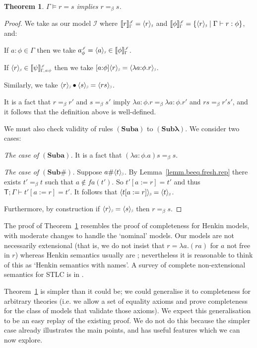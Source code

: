 \documentclass[submission,copyright]{eptcs}
\newtheorem{thrm}{Theorem}[section]
\newcommand{\beq}{=_{\scriptstyle{\beta}}}
\newcommand{\f}[1]{\ensuremath{\text{$\mathit{#1}$}}}
\newcommand{\lam}[1]{\lambda{#1}.}
\newcommand{\beeq}[1]{\ensuremath{\langle #1 \rangle_{\scalebox{.5}{\hspace{-.2ex}$\beta$}}}} \newcommand{\model}[1]{\ensuremath{\llbracket #1 \rrbracket}}
\newcommand{\rulefont}[1]{\ensuremath{(\mathbf{#1})}}
\newcommand{\ssm}{:=}
\newcommand{\theory}[1]{\ensuremath{\mathsf{#1}}}
\newcommand{\fa}{\f{fa}}
\newcommand\den[1]{{\hspace{.00ex}\scalebox{.55}{$#1$}}}
\newcommand{\idenot}[2]{\denot{\interp I}{#1}{#2}}
\newcommand\interp[1]{\ensuremath{\mathscr #1}}
\newcommand{\denot}[3]{\llbracket #3 \rrbracket_{\scalebox{.6}{$#2$}}^\den{#1}} \newcommand{\hdenot}[1]{\denot{\interp H}{}{#1}}
\newcommand\cent{\vdash}
\newcommand\ment{\vDash}
\begin{document}
\begin{thrm}
\label{thrm.st.complete}
$\Gamma\ment r=s$ implies $r\beq s$.
\end{thrm}
\begin{proof}
We take as our model $\interp I$ where $\idenot{\Gamma}{r}=\beeq{r}$ and $\idenot{\Gamma}{\phi}=\{\beeq{r}\mid \Gamma\cent r:\phi\}$, and:
\begin{itemize*}
\item
If $a:\phi\in\Gamma$ then we take $a^\iden_\phi=\beeq{a}\in\idenot{\Gamma}{\phi}$.
\item
If $\beeq{r}\in\idenot{\Gamma,a{:}\phi}{\psi}$ then we take $[a{:}\phi]\beeq{r}=\beeq{\lam{a{:}\phi}r}$.
\item
Similarly, we take $\beeq{r}\bullet \beeq{s}=\beeq{rs}$.
\end{itemize*}
It is a fact that $r\beq r'$ and $s\beq s'$ imply $\lam{a{:}\phi}r\beq \lam{a{:}\phi}r'$ and $rs\beq r's'$, and it follows that the definition above is well-defined.

We must also check validity of rules \rulefont{Suba} to \rulefont{Sub\text{$\lambda$}}. 
We consider two cases:
\begin{itemize*}
\item
\emph{The case of \rulefont{Suba}.}\quad
It is a fact that $(\lam{a{:}\phi}a)s\beq s$. 
\item
\emph{The case of \rulefont{Sub\#}.}\quad
Suppose $a\#\beeq{t}$.
By Lemma~\ref{lemm.beeq.fresh.rep} there exists $t'\beq t$ such that $a\not\in\fa(t')$.
So $t'[a\ssm r]=t'$ and thus $\theory T;\Gamma\cent t'[a\ssm r]= t'$.
It follows that $\beeq{t[a\ssm r]}=\beeq{t}$. 
\end{itemize*}

Furthermore, by construction if $\beeq{r}=\beeq{s}$ then $r\beq s$. 
\end{proof}
The proof of Theorem~\ref{thrm.st.complete} resembles the proof of completeness for Henkin models, with moderate changes to handle the `nominal' models.
Our models are not necessarily extensional (that is, we do not insist that $r=\lam{a}(ra)$ for $a$ not free in $r$) whereas Henkin semantics usually are \cite{henkin:comtot}; nevertheless it is reasonable to think of this as `Henkin semantics with names'.
A survey of complete non-extensional semantics for STLC is in \cite{benzmuller:higose}.

Theorem~\ref{thrm.st.complete} is simpler than it could be; we could generalise it to completeness for arbitrary theories (i.e. we allow a set of equality axioms and prove completeness for the class of models that validate those axioms).  
We expect this generalisation to be an easy replay of the existing proof.
We do not do this because the simpler case already illustrates the main points, and has useful features which we can now explore.
\end{document}
